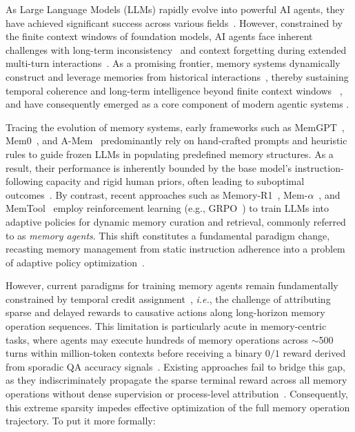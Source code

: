 \documentclass[11pt, a4paper]{lumia}
\begin{document}
As Large Language Models (LLMs) rapidly evolve into powerful AI agents, they have achieved significant success across various fields~\citep{hong2023metagpt,wu2024autogen, qian2025toolrl, yang2025Qwen3technicalreport,xu2025comprehensivesurveydeepresearch}. 
However, constrained by the finite context windows of foundation models, AI agents face inherent challenges with long-term inconsistency~\citep{li2024long,liu2025comprehensivesurveylongcontext} and context forgetting during extended multi-turn interactions~\citep{ai2025memorybench,liu2025comprehensivesurveylongcontext}. 
As a promising frontier, memory systems dynamically construct and leverage memories from historical interactions~\citep{li2025memosoperatingmemoryaugmentedgeneration,fang2025lightmem}, thereby sustaining temporal coherence and long-term intelligence beyond finite context windows ~\citep{DBLP:journals/corr/abs-2509-12810,DBLP:conf/aaai/Zhao0XLLH24}, and have consequently emerged as a core component of modern agentic systems \citep{Chhikara2025mem0, zhang2025memevolve}.



Tracing the evolution of memory systems, early frameworks such as MemGPT~\citep{packer2023memgpt}, Mem0~\citep{Chhikara2025mem0}, and A-Mem~\citep{xuAMEMAgenticMemory2025} predominantly rely on hand-crafted prompts and heuristic rules to guide frozen LLMs in populating predefined memory structures. As a result, their performance is inherently bounded by the base model’s instruction-following capacity and rigid human priors, often leading to suboptimal outcomes~\citep{xiong2025memorymanagementimpactsllm,DBLP:conf/iclr/WuWYZCY25}. 
By contrast, recent approaches such as Memory-R1~\citep{yan2025memory}, Mem-$\alpha$~\citep{DBLP:journals/corr/abs-2509-25911}, and MemTool~\citep{lumer2025memtool} employ reinforcement learning (e.g., GRPO~\citep{shao2024deepseekmath}) to train LLMs into adaptive policies for dynamic memory curation and retrieval, commonly referred to as \emph{memory agents}. This shift constitutes a fundamental paradigm change, recasting memory management from static instruction adherence into a problem of adaptive policy optimization~\citep{hu2026memoryageaiagents}.


However, current paradigms for training memory agents remain fundamentally constrained by temporal credit assignment~\citep{pignatelli2024surveytemporalcreditassignment}, \textit{i.e.}, the challenge of attributing sparse and delayed rewards to causative actions along long-horizon memory operation sequences. This limitation is particularly acute in memory-centric tasks, where agents may execute hundreds of memory operations across $\sim$500 turns within million-token contexts before receiving a binary $0/1$ reward derived from sporadic QA accuracy signals~\citep{DBLP:conf/iclr/WuWYZCY25,tan2025membench}. Existing approaches fail to bridge this gap, as they indiscriminately propagate the sparse terminal reward across all memory operations without dense supervision or process-level attribution~\citep{yan2025memory,DBLP:journals/corr/abs-2509-25911}. Consequently, this extreme sparsity impedes effective optimization of the full memory operation trajectory. To put it more formally:
\end{document}
